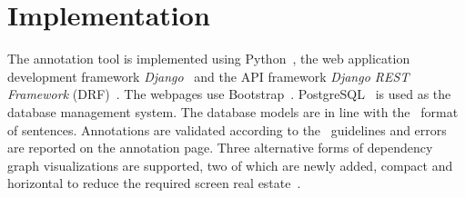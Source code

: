\section{Implementation}
\label{sec:implementation}


The annotation tool is implemented using Python~\cite{python}, the web application development framework \textit{Django}~\cite{django} and the API framework \textit{Django REST Framework} (DRF)~\cite{drf}.
The webpages use Bootstrap~\cite{bootstrap}.
PostgreSQL~\cite{psql} is used as the database management system.
The database models are in line with the \ud\ format of sentences.
Annotations are validated according to the \ud\ guidelines and errors are reported on the annotation page.
Three alternative forms of dependency graph visualizations are supported, two of which are newly added, compact and horizontal to reduce the required screen real estate~\cite{spacy,spyssalo}.

